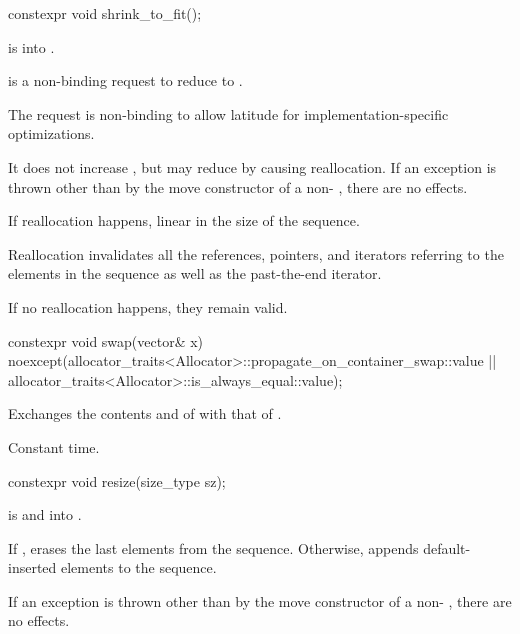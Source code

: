 %
\begin{itemdecl}
constexpr void shrink_to_fit();
\end{itemdecl}

\begin{itemdescr}
\pnum
\expects
{} is  into .

\pnum
\effects
{} is a non-binding request to reduce
 to .
\begin{note}
The request is non-binding to allow latitude for
implementation-specific optimizations.
\end{note}
It does not increase , but may reduce 
by causing reallocation.
If an exception is thrown other than by the move constructor
of a non- , there are no effects.

\pnum
\complexity
If reallocation happens,
linear in the size of the sequence.

\pnum
\remarks
Reallocation invalidates all the references, pointers, and iterators
referring to the elements in the sequence as well as the past-the-end iterator.
\begin{note}
If no reallocation happens, they remain valid.
\end{note}
\end{itemdescr}

%
\begin{itemdecl}
constexpr void swap(vector& x)
  noexcept(allocator_traits<Allocator>::propagate_on_container_swap::value ||
           allocator_traits<Allocator>::is_always_equal::value);
\end{itemdecl}

\begin{itemdescr}
\pnum
\effects
Exchanges the contents and
of
with that of .

\pnum
\complexity
Constant time.
\end{itemdescr}

%
\begin{itemdecl}
constexpr void resize(size_type sz);
\end{itemdecl}

\begin{itemdescr}
\pnum
\expects
{} is
 and  into .

\pnum
\effects
If , erases the last  elements
from the sequence. Otherwise,
appends  default-inserted elements to the sequence.

\pnum
\remarks
If an exception is thrown other than by the move constructor of a non-
, there are no effects.
\end{itemdescr}

